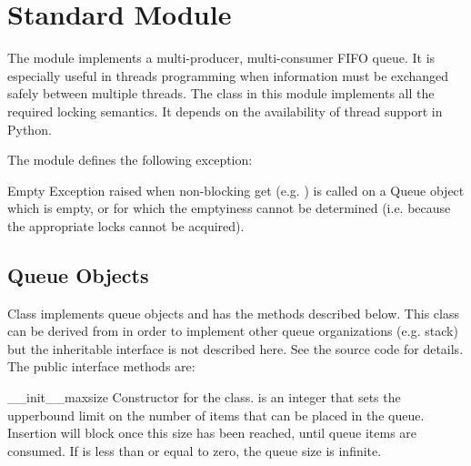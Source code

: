 \section{Standard Module }

\label{module-Queue}


The  module implements a multi-producer, multi-consumer
FIFO queue.  It is especially useful in threads programming when
information must be exchanged safely between multiple threads.  The
 class in this module implements all the required locking
semantics.  It depends on the availability of thread support in
Python.

The  module defines the following exception:

\renewcommand{\indexsubitem}{(in module Queue)}

\begin{excdesc}{Empty}
Exception raised when non-blocking get (e.g. ) is
called on a Queue object which is empty, or for which the emptyiness
cannot be determined (i.e. because the appropriate locks cannot be
acquired).
\end{excdesc}

\subsection{Queue Objects}

Class  implements queue objects and has the methods
described below.  This class can be derived from in order to implement
other queue organizations (e.g. stack) but the inheritable interface
is not described here.  See the source code for details.  The public
interface methods are:

\renewcommand{\indexsubitem}{(__init__ method)}

\begin{funcdesc}{__init__}{maxsize}
Constructor for the class.   is an integer that sets the
upperbound limit on the number of items that can be placed in the
queue.  Insertion will block once this size has been reached, until
queue items are consumed.  If  is less than or equal to
zero, the queue size is infinite.
\end{funcdesc}

